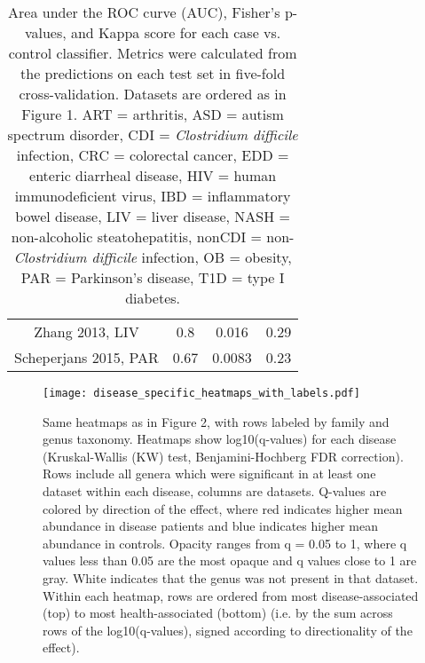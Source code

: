 {{\begin{table}[h]
{\begin{tabular}{ c  c  c  c}
	Zhang 2013, LIV & 0.8 & 0.016 & 0.29 \\
	Scheperjans 2015, PAR & 0.67 & 0.0083 & 0.23 \\
	\hline
\end{tabular}}
\caption{Area under the ROC curve (AUC), Fisher's p-values, and Kappa score for each case vs. control classifier. Metrics were calculated from the predictions on each test set in five-fold cross-validation. Datasets are ordered as in Figure 1. ART = arthritis, ASD = autism spectrum disorder, CDI = \textit{Clostridium difficile} infection, CRC = colorectal cancer, EDD = enteric diarrheal disease, HIV = human immunodeficient virus, IBD = inflammatory bowel disease, LIV = liver disease, NASH = non-alcoholic steatohepatitis, nonCDI = non-\textit{Clostridium difficile} infection, OB = obesity, PAR = Parkinson's disease, T1D = type I diabetes.}\label{tab:kappa}
\end{table}
}

\FloatBarrier
{}
\newpage \pdfpagewidth=16in \pdfpageheight=18in
\FloatBarrier

\begin{figure}[h]
	\begin{centering}
	\texttt{[image: disease\_specific\_heatmaps\_with\_labels.pdf]}
	\caption{Same heatmaps as in Figure 2, with rows labeled by family and genus taxonomy. Heatmaps show log10(q-values) for each disease (Kruskal-Wallis (KW) test, Benjamini-Hochberg FDR correction). Rows include all genera which were significant in at least one dataset within each disease, columns are datasets. Q-values are colored by direction of the effect, where red indicates higher mean abundance in disease patients and blue indicates higher mean abundance in controls. Opacity ranges from q = 0.05 to 1, where q values less than 0.05 are the most opaque and q values close to 1 are gray. White indicates that the genus was not present in that dataset. Within each heatmap, rows are ordered from most disease-associated (top) to most health-associated (bottom) (i.e. by the sum across rows of the log10(q-values), signed according to directionality of the effect).
}
	\label{fig:supp_dis_specific}
	\end{centering}
\end{figure}


\restoregeometry
\FloatBarrier

\newpage \pdfpagewidth=8.5in \pdfpageheight=27in
\FloatBarrier

}
